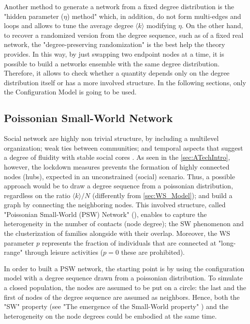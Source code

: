 \documentclass[a4paper,10pt,twoside]{book} %
\theoremstyle{definition}
\begin{document}
Another method to generate a network from a fixed degree distribution is the "hidden parameter ($\eta$) method" which, in addition, do not form multi-edges and loops \cite{barabasi::2016networkbook} and allows to tune the average degree $\langle k \rangle$ modifying $\eta$.
On the other hand, to recover a randomized version from the degree sequence, such as of a fixed real network, the "degree-preserving randomization" is the best help the theory provides. In this way, by just swapping two endpoint nodes at a time, it is possible to build a networks ensemble with the same degree distribution. Therefore, it allows to check whether a quantity depends only on the degree distribution itself or has a more involved structure.
In the following sections, only the Configuration Model is going to be used.

\clearpage
\subsection{Poissonian Small-World Network}
\label{sec:PSW_network}
Social network are highly non trivial structure, by including a multilevel organization; weak ties between communities; and temporal aspects that suggest a degree of fluidity with stable social cores \cite{Thurner::NetBasedExpl}.
As seen in the \autoref{sec:ATechIntro}, however, the lockdown measures prevents the formation of highly connected nodes (hubs), expected in an unconstrained (social) scenario. Thus, a possible approach would be to draw a degree sequence from a poissonian distribution, regardless on the ratio $\langle k \rangle / N$ (differently from \autoref{sec:WS_Model}); and build a graph by connecting the neighboring nodes.
This involved structure, called "Poissonian Small-World (PSW) Network" (\cite{Thurner::NetBasedExpl}), enables to capture the heterogeneity in the number of contacts (node degree); the SW phenomenon and the clusterization of families alongside with their overlap. Moreover, the WS parameter $p$ represents the fraction of individuals that are connected at "long-range" through leisure activities ($p = 0$ these are prohibited).

In order to built a PSW network, the starting point is by using the configuration model with a degree sequence drawn from a poissonian distribution. To simulate a closed population, the nodes are assumed to be put on a circle: the last and the first of nodes of the degree sequence are assumed as neighbors. Hence, both the "SW" property (see "The emergence of the Small-World property" ) and the heterogeneity on the node degrees could be embodied at the same time. 
\end{document}
